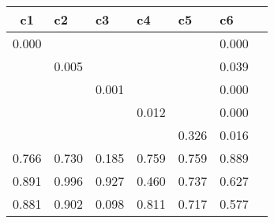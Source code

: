 \begin{table}[htbp]
\begin{tabular}{|l|l|l|l|l|l|l|}\hline  
 \multicolumn{1}{c}{ c1 }  & c2  & c3  & c4  & c5  & c6  \\ \hline  
    0.000 &  &  &  &  &     0.000 \\ \hline 
 &     0.005 &  &  &  &     0.039 \\ \hline 
 &  &     0.001 &  &  &     0.000 \\ \hline 
 &  &  &     0.012 &  &     0.000 \\ \hline 
 &  &  &  &     0.326 &     0.016 \\ \hline 
    0.766 &     0.730 &     0.185 &     0.759 &     0.759 &     0.889 \\ \hline 
    0.891 &     0.996 &     0.927 &     0.460 &     0.737 &     0.627 \\ \hline 
    0.881 &     0.902 &     0.098 &     0.811 &     0.717 &     0.577 \\ \hline 
  \end{tabular}
\end{table}
